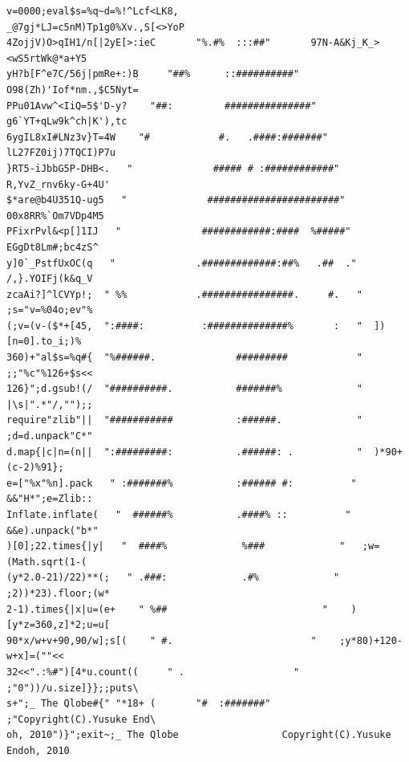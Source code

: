 \documentclass[12pt,a4paper,oneside,openright]{book}
\begin{document}
\begin{CJK}{UTF8}{}
\appendix
\begin{savequote}[8cm]
  \begin{singlespace}
\begin{tiny}
\begin{verbatim}
v=0000;eval$s=%q~d=%!^Lcf<LK8,                  _@7gj*LJ=c5nM)Tp1g0%Xv.,S[<>YoP
4ZojjV)O>qIH1/n[|2yE[>:ieC       "%.#%  :::##"       97N-A&Kj_K_><wS5rtWk@*a+Y5
yH?b[F^e7C/56j|pmRe+:)B     "##%      ::##########"     O98(Zh)'Iof*nm.,$C5Nyt=
PPu01Avw^<IiQ=5$'D-y?    "##:         ###############"    g6`YT+qLw9k^ch|K'),tc
6ygIL8xI#LNz3v}T=4W    "#            #.   .####:#######"    lL27FZ0ij)7TQCI)P7u
}RT5-iJbbG5P-DHB<.   "              ##### # :############"   R,YvZ_rnv6ky-G+4U'
$*are@b4U351Q-ug5   "              #######################"   00x8RR%`Om7VDp4M5
PFixrPvl&<p[]1IJ   "              ############:####  %#####"   EGgDt8Lm#;bc4zS^
y]0`_PstfUxOC(q   "              .#############:##%   .##  ."   /,}.YOIFj(k&q_V
zcaAi?]^lCVYp!;  " %%            .################.     #.   "  ;s="v=%04o;ev"%
(;v=(v-($*+[45,  ":####:          :##############%       :   "  ])[n=0].to_i;)%
360)+"al$s=%q#{  "%######.              #########            "  ;;"%c"%126+$s<<
126}";d.gsub!(/  "##########.           #######%             "  |\s|".*"/,"");;
require"zlib"||  "###########           :######.             "  ;d=d.unpack"C*"
d.map{|c|n=(n||  ":#########:           .######: .           "  )*90+(c-2)%91};
e=["%x"%n].pack   " :#######%           :###### #:          "   &&"H*";e=Zlib::
Inflate.inflate(   "  ######%           .####% ::          "   &&e).unpack("b*"
)[0];22.times{|y|   "  ####%             %###             "   ;w=(Math.sqrt(1-(
(y*2.0-21)/22)**(;   " .###:             .#%             "   ;2))*23).floor;(w*
2-1).times{|x|u=(e+    " %##                           "    )[y*z=360,z]*2;u=u[
90*x/w+v+90,90/w];s[(    " #.                        "    ;y*80)+120-w+x]=(""<<
32<<".:%#")[4*u.count((     " .                   "     ;"0"))/u.size]}};;puts\
s+";_ The Qlobe#{" "*18+ (       "#  :#######"       ;"Copyright(C).Yusuke End\
oh, 2010")}";exit~;_ The Qlobe                  Copyright(C).Yusuke Endoh, 2010
\end{verbatim}
\end{tiny}
  \end{singlespace}
\end{savequote}

\end{CJK}
\end{document}
